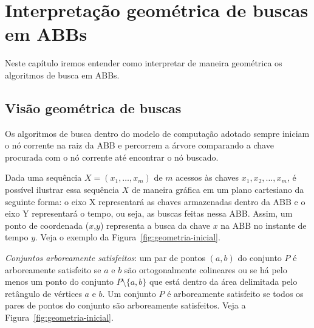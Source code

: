 
\chapter{Interpretação geométrica de buscas em ABBs}
\label{cap:geometria}

Neste capítulo iremos entender como interpretar de maneira geométrica os algoritmos de busca em ABBs.

\section{Visão geométrica de buscas}

Os algoritmos de busca dentro do modelo de computação adotado sempre iniciam o nó corrente na raiz da ABB e percorrem a árvore comparando a chave procurada com o nó corrente até encontrar o nó buscado.

Dada uma sequência $X = (x_{1},\ldots,x_{m})$ de $m$ acessos às chaves $x_{1}, x_{2},\ldots,x_{m}$, é possível ilustrar essa sequência $X$ de maneira gráfica em um plano cartesiano da seguinte forma: o eixo X representará as chaves armazenadas dentro da ABB e o eixo Y representará o tempo, ou seja, as buscas feitas nessa ABB. Assim, um ponto de coordenada ($x$,$y$) representa a busca da chave $x$ na ABB no instante de tempo $y$. Veja o exemplo da Figura~\ref{fig:geometria-inicial}.

\textit{Conjuntos arboreamente satisfeitos}: um par de pontos $(a,b)$ do conjunto $P$ é arboreamente satisfeito se $a$ e $b$ são ortogonalmente colineares ou se há pelo menos um ponto do conjunto \( P \setminus \{a,b\} \) que está dentro da área delimitada pelo retângulo de vértices $a$ e $b$. Um conjunto $P$ é arboreamente satisfeito se todos os pares de pontos do conjunto são arboreamente satisfeitos. Veja a Figura~\ref{fig:geometria-inicial}.

